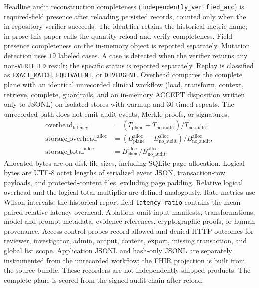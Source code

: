 \documentclass[journal]{IEEEtran}
\begin{document}
Headline audit reconstruction completeness
(\texttt{independently\_verified\_arc}) is required-field presence after
reloading persisted records, counted only when the in-repository verifier
succeeds. The identifier retains the historical metric name; in prose this
paper calls the quantity reload-and-verify completeness. Field-presence
completeness on the in-memory object is reported separately. Mutation detection
uses $19$ labeled cases. A case is detected when the verifier returns any
non-\texttt{VERIFIED} result; the specific status is reported separately. Replay is classified as
\texttt{EXACT\_MATCH}, \texttt{EQUIVALENT}, or \texttt{DIVERGENT}. Overhead
compares the complete plane with an identical unrecorded clinical workflow
(load, transform, context, retrieve, complete, guardrails, and an in-memory
ACCEPT disposition written only to JSONL) on isolated stores with warmup and
$30$ timed repeats. The unrecorded path does not emit audit events, Merkle
proofs, or signatures.
\begin{align}
\mathrm{overhead}_{\mathrm{latency}} &= (T_{\mathrm{plane}}-T_{\mathrm{no\_audit}})/T_{\mathrm{no\_audit}}, \\
\mathrm{storage\_overhead}^{\mathrm{alloc}} &= (B_{\mathrm{plane}}^{\mathrm{alloc}}-B_{\mathrm{no\_audit}}^{\mathrm{alloc}})/B_{\mathrm{no\_audit}}^{\mathrm{alloc}}, \\
\mathrm{storage\_total}^{\mathrm{alloc}} &= B_{\mathrm{plane}}^{\mathrm{alloc}}/B_{\mathrm{no\_audit}}^{\mathrm{alloc}}.
\end{align}
Allocated bytes are on-disk file sizes, including SQLite page allocation.
Logical bytes are UTF-8 octet lengths of serialized event JSON, transaction-row
payloads, and protected-content files, excluding page padding. Relative logical
overhead and the logical total multiplier are defined analogously. Rate metrics use Wilson
intervals; the historical report field \texttt{latency\_ratio} contains the
mean paired relative latency overhead. Ablations omit input
manifests, transformations, model and prompt metadata, evidence references,
cryptographic proofs, or human provenance. Access-control probes record
allowed and denied HTTP outcomes for reviewer, investigator, admin, output,
content, export, missing transaction, and global list scope. Application JSONL
and hash-only JSONL are separately instrumented from the unrecorded workflow;
the FHIR projection is built from the source bundle. These recorders are not
independently shipped products. The complete plane is scored from the signed
audit chain after reload.
\end{document}
